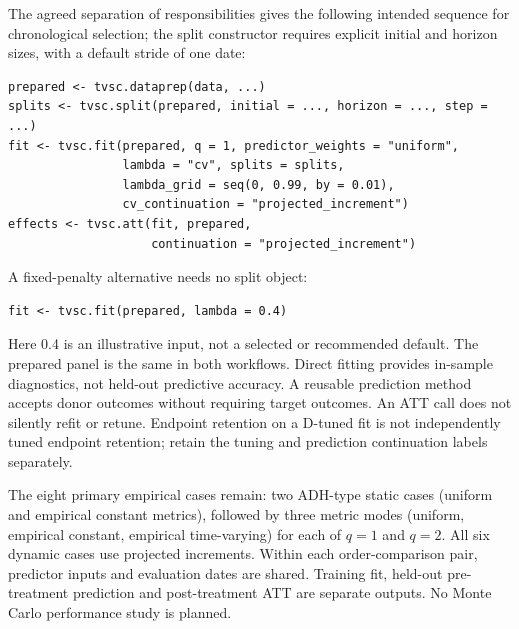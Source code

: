 \documentclass[11pt]{article}
\begin{document}
The agreed separation of responsibilities gives the following intended
sequence for chronological selection; the split constructor requires
explicit initial and horizon sizes, with a default stride of one date:
\begin{verbatim}
prepared <- tvsc.dataprep(data, ...)
splits <- tvsc.split(prepared, initial = ..., horizon = ..., step = ...)
fit <- tvsc.fit(prepared, q = 1, predictor_weights = "uniform",
                lambda = "cv", splits = splits,
                lambda_grid = seq(0, 0.99, by = 0.01),
                cv_continuation = "projected_increment")
effects <- tvsc.att(fit, prepared,
                    continuation = "projected_increment")
\end{verbatim}
A fixed-penalty alternative needs no split object:
\begin{verbatim}
fit <- tvsc.fit(prepared, lambda = 0.4)
\end{verbatim}
Here 0.4 is an illustrative input, not a selected or recommended default.
The prepared panel is the same in both workflows. Direct fitting provides
in-sample diagnostics, not held-out predictive accuracy.
A reusable prediction method accepts donor outcomes without requiring
target outcomes. An ATT call does not silently refit or retune.
Endpoint retention on a D-tuned fit is not independently tuned endpoint
retention; retain the tuning and prediction continuation labels separately.

The eight primary empirical cases remain: two ADH-type static cases
(uniform and empirical constant metrics), followed by three metric modes
(uniform, empirical constant, empirical time-varying) for each of $q=1$
and $q=2$. All six dynamic cases use projected increments. Within each
order-comparison pair, predictor inputs and evaluation dates are shared.
Training fit, held-out pre-treatment prediction and post-treatment ATT
are separate outputs. No Monte Carlo performance study is planned.
\end{document}
